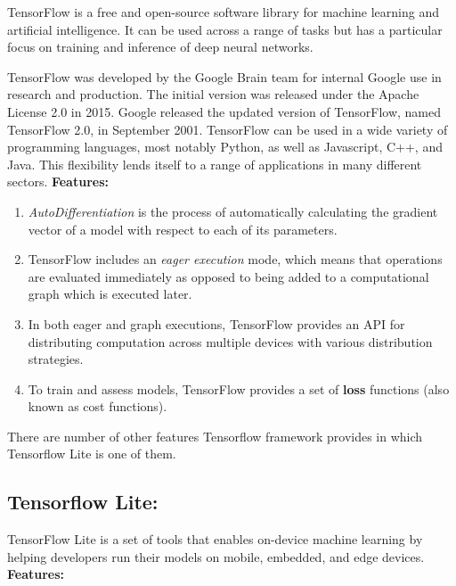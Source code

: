 TensorFlow is a free and open-source software library for machine learning and artificial intelligence. It can be used across a range of tasks but has a particular focus on training and inference of deep neural networks.

TensorFlow was developed by the Google Brain team for internal Google use in research and production. The initial version was released under the Apache License 2.0 in 2015. Google released the updated version of TensorFlow, named TensorFlow 2.0, in September 2001. TensorFlow can be used in a wide variety of programming languages, most notably Python, as well as Javascript, C++, and Java. This flexibility lends itself to a range of applications in many different sectors.
\break\break
\textbf{Features:}

\begin{enumerate}
  \item \textit{AutoDifferentiation} is the process of automatically calculating the gradient vector of a model with respect to each of its parameters. 
  \item TensorFlow includes an \textit{eager execution} mode, which means that operations are evaluated immediately as opposed to being added to a computational graph which is executed later.
  \item In both eager and graph executions, TensorFlow provides an API for distributing computation across multiple devices with various distribution strategies. 
  \item To train and assess models, TensorFlow provides a set of \textbf{loss} functions (also known as cost functions).
\end{enumerate}

There are number of other features Tensorflow framework provides in which Tensorflow Lite is one of them. 

\subsection{Tensorflow Lite:}
TensorFlow Lite is a set of tools that enables on-device machine learning by helping developers run their models on mobile, embedded, and edge devices.
\break\break
\textbf{Features:} 

